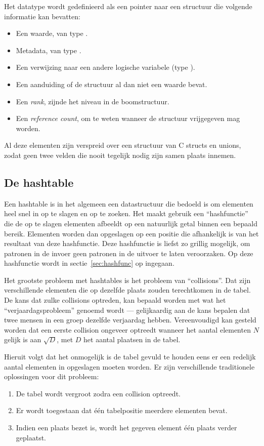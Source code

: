 Het datatype  wordt gedefinieerd als een pointer naar een structuur die volgende informatie kan bevatten: \begin{itemize}
  \item Een waarde, van type .
  \item Metadata, van type .
  \item Een verwijzing naar een andere logische variabele (type ).
  \item Een aanduiding of de structuur al dan niet een waarde bevat.
  \item Een {\em rank}, zijnde het niveau in de boomstructuur.
  \item Een {\em reference count}, om te weten wanneer de structuur vrijgegeven mag worden.
\end{itemize}
Al deze elementen zijn verspreid over een structuur van C structs en unions, zodat geen twee velden die nooit tegelijk nodig zijn samen plaats innemen.

\subsection{De hashtable} \label{sec:hashtable}

Een hashtable is in het algemeen een datastructuur die bedoeld is om elementen heel snel in op te slagen en op te zoeken. Het maakt gebruik een ``hashfunctie'' die de op te slagen elementen afbeeldt op een natuurlijk getal binnen een bepaald bereik. Elementen worden dan opgeslagen op een positie die afhankelijk is van het resultaat van deze hashfunctie. Deze hashfunctie is liefst zo grillig mogelijk, om patronen in de invoer geen patronen in de uitvoer te laten veroorzaken. Op deze hashfunctie wordt in sectie~\ref{sec:hashfunc} op ingegaan.

Het grootste probleem met hashtables is het probleem van ``collisions''. Dat zijn verschillende elementen die op dezelfde plaats zouden terechtkomen in de tabel. De kans dat zulke collisions optreden, kan bepaald worden met wat het ``verjaardagsprobleem'' genoemd wordt --- gelijkaardig aan de kans bepalen dat twee mensen in een groep dezelfde verjaardag hebben. Vereenvoudigd kan gesteld worden dat een eerste collision ongeveer optreedt wanneer het aantal elementen $N$ gelijk is aan $\sqrt{D}$, met $D$ het aantal plaatsen in de tabel.

Hieruit volgt dat het onmogelijk is de tabel gevuld te houden eens er een redelijk aantal elementen in opgeslagen moeten worden. Er zijn verschillende traditionele oplossingen voor dit probleem: \begin{enumerate}
\item De tabel wordt vergroot zodra een collision optreedt.
\item Er wordt toegestaan dat \'e\'en tabelpositie meerdere elementen bevat.
\item Indien een plaats bezet is, wordt het gegeven element \'e\'en plaats verder geplaatst.
\end{enumerate}

